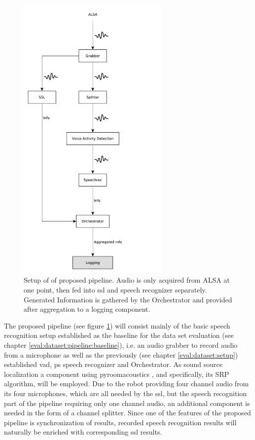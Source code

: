 \begin{figure}[]
	\centering
	\includegraphics[width=0.66\textwidth]{diagrams/eval_task_proposed.pdf}
	\caption{Setup of of proposed pipeline.
		Audio is only acquired from ALSA at one point, then fed into \gls{ssl} and speech recognizer separately.
		Generated Information is gathered by the Orchestrator and provided after aggregation to a logging component.}
	\label{pic:eval_task_setup_new}
\end{figure}

The proposed pipeline (see figure \ref{pic:eval_task_setup_new}) will consist mainly of the basic speech recognition setup established as the baseline for the data set evaluation (see chapter \ref{eval:dataset:pipeline:baseline}), i.e. an audio grabber to record audio from a microphone as well as the previously (see chapter \ref{eval:dataset:setup}) established \gls{vad}, \gls{ps} speech recognizer and Orchestrator.
As sound source localization a component using pyroomacoustics \cite{pyroomacoustics}, and specifically, its SRP algorithm, will be employed.
Due to the robot providing four channel audio from its four microphones, which are all needed by the \gls{ssl}, but the speech recognition part of the pipeline requiring only one channel audio, an additional component is needed in the form of a channel splitter.
Since one of the features of the proposed pipeline is synchronization of results, recorded speech recognition results will naturally be enriched with corresponding \gls{ssl} results.

